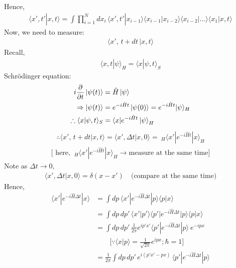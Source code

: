 \documentclass[14pt]{article} %
\begin{document}
\noindent
Hence,
\begin{align*}
\langle x', t' | x, t \rangle = \int \prod_{i=1}^N dx_i \, \langle x', t' | x_{i-1} \rangle \langle x_{i-1}| x_{i-2} \rangle \langle x_{i-2}| \dots \rangle \langle x_1 | x, t \rangle
\end{align*}
Now, we need to measure:
\begin{align*}
\langle x',\, t + dt \,| x, t \rangle
\end{align*}
Recall,
\begin{align*}
\langle x, t | \psi \rangle_H = \langle x | \psi, t \rangle_S
\end{align*}
Schrödinger equation:
\begin{align*}
i \frac{\partial}{\partial t} \ket{\psi(t)} &= \hat{H} \ket{\psi} \\
\Rightarrow \ket{\psi(t)} &= e^{-i \hat{H} t}  \ket{\psi(0)} = e^{- i \hat{H}t } |\psi \rangle_H \\
\therefore  \langle x | \psi, t \rangle_S &= \langle x | e^{-i \hat{H} t} \ket{\psi}_H
\end{align*}
\begin{align*}
\boxed{\therefore \langle x',\, t + dt | x, t \rangle 
= \langle x', \Delta t | x,0 \rangle =  ~_H\langle x' | e^{-i \hat{H} t} | x \rangle_H}
\end{align*}
\begin{align*}
\big[ \text{ here, } ~_H\langle x' | e^{-i \hat{H} t} | x \rangle_H \to \text{measure at the same time} \big]
\end{align*}
Note as $\Delta t \to 0$,
\begin{align*}
\langle x', \Delta t | x,0 \rangle = \delta(x - x') \quad \text{(compare at the same time)}
\end{align*}
Hence,
\begin{align*}
\langle x' | e^{-i \hat{H} \Delta t} | x \rangle &= \int dp \, \langle x' | e^{-i \hat{H} \Delta t} |p \rangle \langle p | x \rangle \\
&= \int dp \, dp' \, \langle x' | p' \rangle \langle p' | e^{-i \hat{H} \Delta t} | p \rangle \langle p | x \rangle \\
&= \int dp \, dp' \, \frac{1}{2\pi} e^{ip'x'} \langle p' | e^{-i \hat{H} \Delta t} | p \rangle ~e^{-ipx} \\
&\quad \quad \big[ \because \langle x|p \rangle = \frac{1}{\sqrt{2 \pi}} e^{ipx} ; \hbar=1 \big] \\
&= \frac{1}{2\pi}\int dp \, dp' \,  e^{i(p'x'-px)}\, \langle p' | e^{-i \hat{H} \Delta t} | p \rangle \\
\end{align*}
\end{document}
